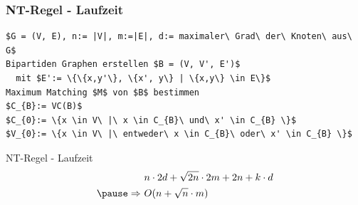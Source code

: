 \documentclass{beamer}
\begin{document}
\begin{frame}[fragile]
\frametitle{NT-Regel - Laufzeit}
\begin{lstlisting}[mathescape = true, basicstyle=\ttfamily]
$G = (V, E), n:= |V|, m:=|E|, d:= maximaler\ Grad\ der\ Knoten\ aus\ G$
Bipartiden Graphen erstellen $B = (V, V', E')$ 
  mit $E':= \{\{x,y'\}, \{x', y\} | \{x,y\} \in E\}$ 
Maximum Matching $M$ von $B$ bestimmen 
$C_{B}:= VC(B)$ 
$C_{0}:= \{x \in V\ |\ x \in C_{B}\ und\ x' \in C_{B} \}$ 
$V_{0}:= \{x \in V\ |\ entweder\ x \in C_{B}\ oder\ x' \in C_{B} \}$ 
\end{lstlisting}
\end{frame}
\begin{frame}{NT-Regel - Laufzeit}
\begin{align*}
&\ n \cdot 2d + \sqrt{2n} \cdot 2m + 2n + k \cdot d\\ \pause
\Rightarrow &\ O(n + \sqrt{n} \cdot m)
\end{align*}
\end{frame}
\end{document}
